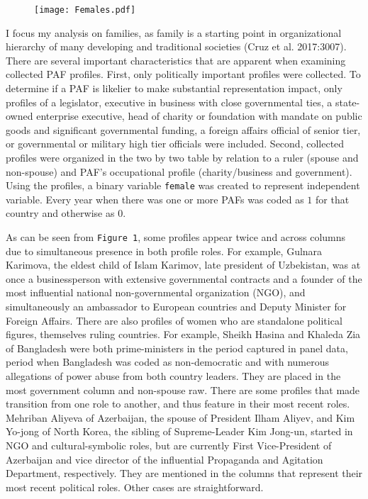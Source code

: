 \documentclass[12pt]{article}
\begin{document}
\begin{figure}[htp]
\centering
\texttt{[image: Females.pdf]}
\label{fig:hypothesis 1 1-2}
\end{figure}

I focus my analysis on families, as family is a starting point in organizational hierarchy of many developing and traditional societies (Cruz et al. 2017:3007). There are several important characteristics that are apparent when examining collected PAF profiles. First, only politically important profiles were collected. To determine if a PAF is likelier to make substantial representation impact, only profiles of a legislator, executive in business with close governmental ties, a state-owned enterprise executive, head of charity or foundation with mandate on public goods and significant governmental funding, a foreign affairs official of senior tier, or governmental or military high tier officials were included. Second, collected profiles were organized in the two by two table by relation to a ruler (spouse and non-spouse) and PAF's occupational profile (charity/business and government). Using the profiles, a binary variable \texttt{female} was created to represent independent variable. Every year when there was one or more PAFs was coded as $1$ for that country and otherwise as $0$.

As can be seen from \texttt{Figure 1}, some profiles appear twice and across columns due to simultaneous presence in both profile roles. For example, Gulnara Karimova, the eldest child of Islam Karimov, late president of Uzbekistan, was at once a businessperson with extensive governmental contracts and a founder of the most influential national non-governmental organization (NGO), and simultaneously an ambassador to European countries and Deputy Minister for Foreign Affairs. There are also profiles of women who are standalone political figures, themselves ruling countries. For example, Sheikh Hasina and Khaleda Zia of Bangladesh were both prime-ministers in the period captured in panel data, period when Bangladesh was coded as non-democratic and with numerous allegations of power abuse from both country leaders. They are placed in the most government column and non-spouse raw. There are some profiles that made transition from one role to another, and thus feature in their most recent roles. Mehriban Aliyeva of Azerbaijan, the spouse of President Ilham Aliyev, and Kim Yo-jong of North Korea, the sibling of Supreme-Leader Kim Jong-un, started in NGO and cultural-symbolic roles, but are currently First Vice-President of Azerbaijan and vice director of the influential Propaganda and Agitation Department, respectively. They are mentioned in the columns that represent their most recent political roles. Other cases are straightforward.
\end{document}
